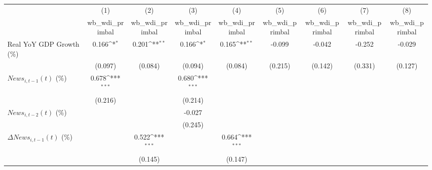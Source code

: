 {
\def\sym#1{\ifmmode^{#1}\else\(^{#1}\)\fi}
\begin{tabular}{l*{8}{c}}
\toprule
                    &\multicolumn{1}{c}{(1)}&\multicolumn{1}{c}{(2)}&\multicolumn{1}{c}{(3)}&\multicolumn{1}{c}{(4)}&\multicolumn{1}{c}{(5)}&\multicolumn{1}{c}{(6)}&\multicolumn{1}{c}{(7)}&\multicolumn{1}{c}{(8)}\\
                    &\multicolumn{1}{c}{wb_wdi_primbal}&\multicolumn{1}{c}{wb_wdi_primbal}&\multicolumn{1}{c}{wb_wdi_primbal}&\multicolumn{1}{c}{wb_wdi_primbal}&\multicolumn{1}{c}{wb_wdi_primbal}&\multicolumn{1}{c}{wb_wdi_primbal}&\multicolumn{1}{c}{wb_wdi_primbal}&\multicolumn{1}{c}{wb_wdi_primbal}\\
\midrule
Real YoY GDP Growth (\%)&       0.166\sym{*}  &       0.201\sym{**} &       0.166\sym{*}  &       0.165\sym{**} &      -0.099         &      -0.042         &      -0.252         &      -0.029         \\
                    &     (0.097)         &     (0.084)         &     (0.094)         &     (0.084)         &     (0.215)         &     (0.142)         &     (0.331)         &     (0.127)         \\
\addlinespace
$ News_{i,t-1}(t)$ (\%)&       0.678\sym{***}&                     &       0.680\sym{***}&                     &                     &                     &                     &                     \\
                    &     (0.216)         &                     &     (0.214)         &                     &                     &                     &                     &                     \\
\addlinespace
$ News_{i,t-2}(t)$ (\%)&                     &                     &      -0.027         &                     &                     &                     &                     &                     \\
                    &                     &                     &     (0.245)         &                     &                     &                     &                     &                     \\
\addlinespace
$ \Delta News_{i,t-1}(t)$ (\%)&                     &       0.522\sym{***}&                     &       0.664\sym{***}&                     &                     &                     &                     \\
                    &                     &     (0.145)         &                     &     (0.147)         &                     &                     &                     &                     \\

\end{tabular}}
